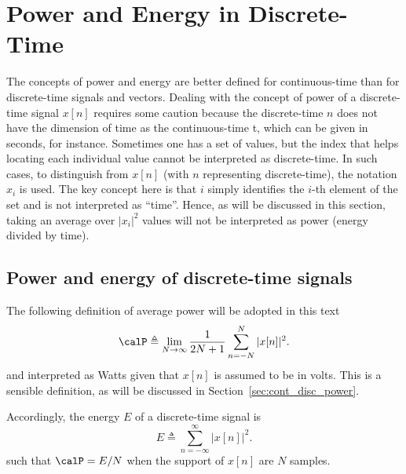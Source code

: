 \section{{\akadvanced} Power and Energy in Discrete-Time}
\label{sec:powerDiscreteTime}
The concepts of power and energy are better defined for continuous-time than for discrete-time signals and vectors.
Dealing with the concept of power of a discrete-time signal $x[n]$ requires some caution because the discrete-time $n$ does not have the
dimension of time as the continuous-time t, which can be given in seconds, for instance. 
Sometimes one has a set of values, but the index that helps locating each individual value cannot be interpreted as
discrete-time. In such cases, to distinguish from $x[n]$ (with $n$ representing discrete-time), the notation $x_i$ is used.
The key concept here is that $i$ simply identifies the $i$-th element of the set and is not interpreted as ``time''. Hence, as will 
be discussed in this section, taking an average over $|x_i|^2$ values will not be interpreted as power (energy divided by time).

\subsection{Power and energy of discrete-time signals}

The following definition of average power will be adopted in this text
\begin{equation}
\calP  \triangleq \lim_{N \rightarrow \infty} \frac{1}{2N+1} \sum_{n=-N}^{N} |x[n]|^2.
\label{eq:power_discrete_time_signals}
\end{equation}
and interpreted as Watts given that $x[n]$ is assumed to be in volts. This is a sensible definition, as will be discussed in Section~\ref{sec:cont_disc_power}.

Accordingly, the energy $E$ of a discrete-time signal is
\begin{equation}
E  \triangleq \sum_{n=-\infty}^{\infty} |x[n]|^2.
\label{eq:energy_discrete_time_signals}
\end{equation}
such that $\calP = E/N$ when the support of $x[n]$ are $N$ samples.



